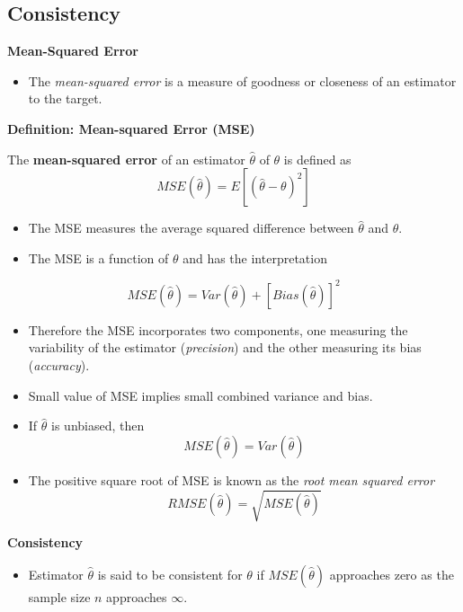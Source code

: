 \documentclass[]{book}
\providecommand{\tightlist}{%
  \setlength{\itemsep}{0pt}\setlength{\parskip}{0pt}}
\begin{document}
\hypertarget{consistency}{%
\subsection{Consistency}\label{consistency}}

\textbf{Mean-Squared Error}

\begin{itemize}
\tightlist
\item
  The \emph{mean-squared error} is a measure of goodness or closeness of an estimator to the target.
\end{itemize}

\textbf{Definition: Mean-squared Error (MSE)}

The \textbf{mean-squared error} of an estimator \(\hat{\theta}\) of \(\theta\) is defined as
\[MSE(\hat{\theta})= E\left[(\hat{\theta} - \theta)^2 \right]\]

\begin{itemize}
\item
  The MSE measures the average squared difference between \(\hat{\theta}\) and \(\theta\).
\item
  The MSE is a function of \(\theta\) and has the interpretation
\end{itemize}

\[MSE(\hat{\theta})= Var(\hat{\theta})+ \left[Bias(\hat{\theta}) \right]^2\]

\begin{itemize}
\item
  Therefore the MSE incorporates two components, one measuring the variability of the estimator (\emph{precision}) and the other measuring its bias (\emph{accuracy}).
\item
  Small value of MSE implies small combined variance and bias.
\item
  If \(\hat{\theta}\) is unbiased, then
  \[MSE(\hat{\theta})= Var(\hat{\theta})\]
\item
  The positive square root of MSE is known as the \emph{root mean squared error}
  \[RMSE(\hat{\theta})= \sqrt{MSE(\hat{\theta})}\]
\end{itemize}

\textbf{Consistency}

\begin{itemize}
\tightlist
\item
  Estimator \(\hat{\theta}\) is said to be consistent for \(\theta\) if \(MSE(\hat{\theta})\) approaches zero as the sample size \(n\) approaches \(\infty\).
\end{itemize}
\end{document}
